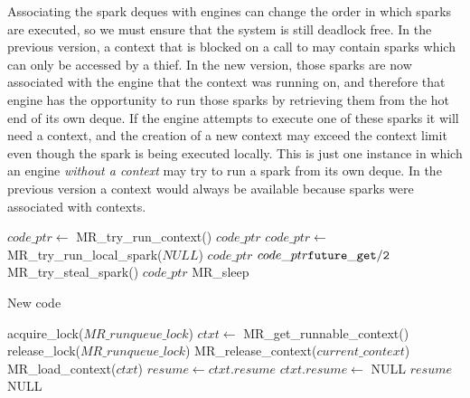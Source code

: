 Associating the spark deques with engines can change the order in which
sparks are executed,
so we must ensure that the system is still deadlock free.
In the previous version,
a context that is blocked on a call to \wait may contain sparks
which can only be accessed by a thief.
In the new version,
those sparks are now associated with the engine that the context was running
on,
and therefore that engine has the opportunity to run those sparks by
retrieving them from the hot end of its own deque.
If the engine attempts to execute one of these sparks it will need a
context,
and the creation of a new context may exceed the context limit even though
the spark is being executed locally.
This is just one instance in which an engine \emph{without a context}
may try to run a spark from its own deque.
In the previous version a context would always be available because sparks
were associated with contexts.

\begin{algorithm}[tbp]
\begin{algorithmic}
        \State $code\_ptr \gets$ MR\_try\_run\_context()
            \Goto $code\_ptr$
        \Else
            \State $code\_ptr \gets$ MR\_try\_run\_local\_spark($NULL$)
                \Goto $code\_ptr$
            \Else
                \State $code\_ptr {\tt future\_get/2}$ MR\_try\_steal\_spark()
                    \Goto $code\_ptr$
                \Else
                    \Goto MR\_sleep
                \EndIf
            \EndIf
        \EndIf
    \EndProcedure
\end{algorithmic}
\caption{New \idle code}
\label{alg:idle_entry_point}
\end{algorithm}

\begin{algorithm}
\begin{algorithmic}
    \State acquire\_lock($MR\_runqueue\_lock$)
    \State $ctxt \gets$ MR\_get\_runnable\_context()
    \State release\_lock($MR\_runqueue\_lock$)
            \State MR\_release\_context($current\_context$)
        \EndIf
        \State MR\_load\_context($ctxt$)
        \State $resume \gets ctxt.resume$
        \State $ctxt.resume \gets$ NULL
        \State \Return $resume$
    \Else
        \State \Return NULL
    \EndIf
\EndProcedure
\end{algorithmic}
\end{algorithm}

